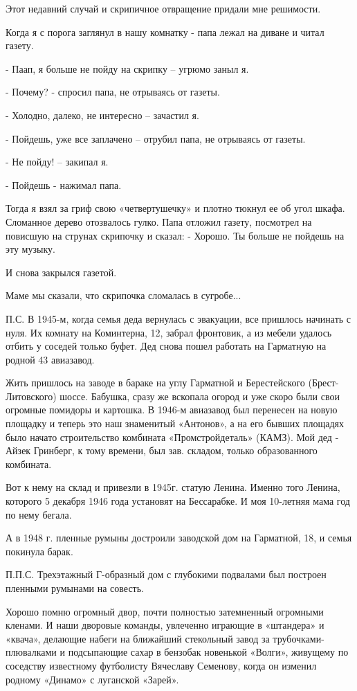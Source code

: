Этот недавний случай и скрипичное отвращение придали мне решимости.

Когда я с порога заглянул в нашу комнатку - папа лежал на диване и читал газету.

- Паап, я больше не пойду на скрипку – угрюмо заныл я.

- Почему? - спросил папа, не отрываясь от газеты.

- Холодно, далеко, не интересно – зачастил я.

- Пойдешь, уже все заплачено – отрубил папа, не отрываясь от газеты.

- Не пойду! – закипал я.

- Пойдешь - нажимал папа.


Тогда я взял за гриф свою «четвертушечку» и плотно тюкнул ее об угол шкафа.
Сломанное дерево отозвалось гулко. Папа отложил газету, посмотрел на повисшую
на струнах скрипочку и сказал: - Хорошо. Ты больше не пойдешь на эту музыку. 

И снова закрылся газетой. 

Маме мы сказали, что скрипочка сломалась в сугробе...

П.С.  В 1945-м, когда семья деда вернулась с эвакуации, все пришлось начинать с
нуля. Их комнату на Коминтерна, 12, забрал фронтовик, а из мебели удалось
отбить у соседей только буфет. Дед снова пошел работать на Гарматную на родной
43 авиазавод.  

Жить пришлось на заводе в бараке на углу Гарматной и Берестейского
(Брест-Литовского) шоссе. Бабушка, сразу же вскопала огород и уже скоро были
свои огромные помидоры и картошка. В 1946-м авиазавод был перенесен на новую
площадку и теперь это наш знаменитый «Антонов», а на его бывших площадях было
начато строительство комбината «Промстройдеталь» (КАМЗ). Мой дед - Айзек
Гринберг, к тому времени, был зав. складом, только образованного комбината.

Вот к нему на склад и привезли в 1945г. статую Ленина. Именно того Ленина,
которого 5 декабря 1946 года   установят на Бессарабке. И моя 10-летняя мама
год по нему бегала. 

А в 1948 г. пленные румыны достроили заводской дом на Гарматной, 18, и семья
покинула барак. 

П.П.С. Трехэтажный Г-образный дом с глубокими подвалами был построен пленными
румынами на совесть. 

Хорошо помню огромный двор, почти полностью затемненный огромными кленами. И
наши дворовые команды, увлеченно играющие в «штандера» и «квача», делающие
набеги на ближайший стекольный завод за трубочками-плювалками и  подсыпающие
сахар в бензобак новенькой «Волги», живущему по соседству известному футболисту
Вячеславу Семенову, когда он изменил родному «Динамо» с луганской «Зарей».

